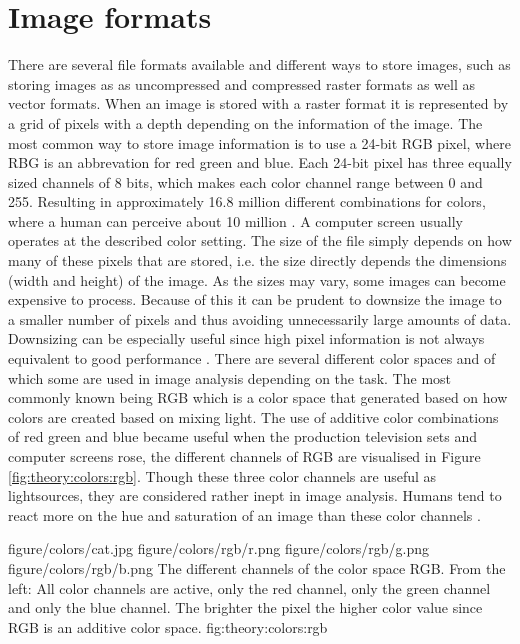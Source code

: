 \section{Image formats}
\label{sec:theory:image_formats}
There are several file formats available and different ways to store images, such as storing images as as uncompressed and compressed raster formats as well as vector formats. When an image is stored with a raster format it is represented by a grid of pixels with a depth depending on the information of the image. The most common way to store image information is to use a 24-bit RGB pixel, where RBG is an abbrevation for red green and blue. Each 24-bit pixel has three equally sized channels of 8 bits, which makes each color channel range between 0 and 255. Resulting in approximately 16.8 million different combinations for colors, where a human can perceive about 10 million \cite[p.388]{judd1975color}. A computer screen usually operates at the described color setting. The size of the file simply depends on how many of these pixels that are stored, i.e. the size directly depends the dimensions (width and height) of the image. As the sizes may vary, some images can become expensive to process. Because of this it can be prudent to downsize the image to a smaller number of pixels and thus avoiding unnecessarily large amounts of data. Downsizing can be especially useful since high pixel information is not always equivalent to good performance \cite{torralba200880}.
There are several different color spaces and of which some are used in image analysis depending on the task. The most commonly known being RGB which is a color space that generated based on how colors are created based on mixing light. The use of additive color combinations of red green and blue became useful when the production television sets and computer screens rose, the different channels of RGB are visualised in Figure \ref{fig:theory:colors:rgb}. Though these three color channels are useful as lightsources, they are considered rather inept in image analysis. Humans tend to react more on the hue and saturation of an image than these color channels \cite{alzu2015semantic}\cite{cheng2001color}. 


\fourfigure
{figure/colors/cat.jpg}
{figure/colors/rgb/r.png}
{figure/colors/rgb/g.png}
{figure/colors/rgb/b.png}
{The different channels of the color space RGB. From the left: All color channels are active, only the red channel, only the green channel and only the blue channel. The brighter the pixel the higher color value since RGB is an additive color space.}
{fig:theory:colors:rgb} 

